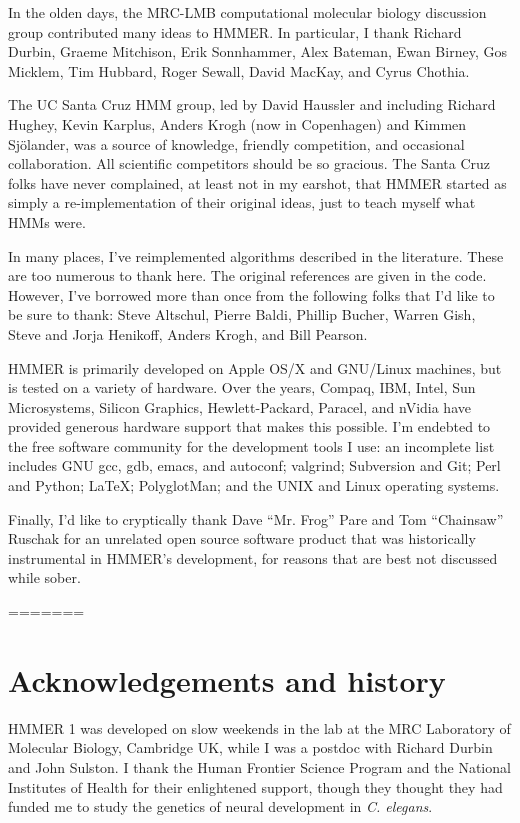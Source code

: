 In the olden days, the MRC-LMB computational molecular biology
discussion group contributed many ideas to HMMER. In particular, I
thank Richard Durbin, Graeme Mitchison, Erik Sonnhammer, Alex Bateman,
Ewan Birney, Gos Micklem, Tim Hubbard, Roger Sewall, David MacKay, and
Cyrus Chothia.

The UC Santa Cruz HMM group, led by David Haussler and including
Richard Hughey, Kevin Karplus, Anders Krogh (now in Copenhagen) and
Kimmen Sj\"{o}lander, was a source of knowledge, friendly competition,
and occasional collaboration. All scientific competitors should be so
gracious. The Santa Cruz folks have never complained, at least not in
my earshot, that HMMER started as simply a re-implementation of their
original ideas, just to teach myself what HMMs were.

In many places, I've reimplemented algorithms described in the
literature. These are too numerous to thank here. The original
references are given in the code. However, I've borrowed more than
once from the following folks that I'd like to be sure to thank: Steve
Altschul, Pierre Baldi, Phillip Bucher, Warren Gish, Steve and Jorja
Henikoff, Anders Krogh, and Bill Pearson.

HMMER is primarily developed on Apple OS/X and GNU/Linux machines, but
is tested on a variety of hardware. Over the years, Compaq, IBM,
Intel, Sun Microsystems, Silicon Graphics, Hewlett-Packard, Paracel,
and nVidia have provided generous hardware support that makes this
possible. I'm endebted to the free software community for the
development tools I use: an incomplete list includes GNU gcc, gdb,
emacs, and autoconf; valgrind; Subversion and Git; Perl and Python;
\LaTeX; PolyglotMan; and the UNIX and Linux operating systems.

Finally, I'd like to cryptically thank Dave ``Mr. Frog'' Pare and Tom
``Chainsaw'' Ruschak for an unrelated open source software product
that was historically instrumental in HMMER's development, for reasons
that are best not discussed while sober.



=======
\chapter{Acknowledgements and history}

HMMER 1 was developed on slow weekends in the lab at the MRC
Laboratory of Molecular Biology, Cambridge UK, while I was a postdoc
with Richard Durbin and John Sulston. I thank the Human Frontier
Science Program and the National Institutes of Health for their
enlightened support, though they thought they had funded me to study
the genetics of neural development in \emph{C. elegans}.

